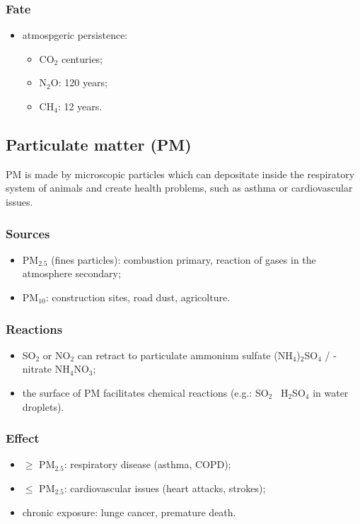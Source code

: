 \documentclass{article}
\begin{document}
\subsubsection{Fate}
\begin{itemize}
    \item atmospgeric persistence:
        \begin{itemize}
            \item CO$_2$ centuries;
            \item N$_2$O: 120 years;
            \item CH$_4$: 12 years.
        \end{itemize}
\end{itemize}

\newpage
\subsection{Particulate matter (PM)}
PM is made by microscopic particles which can depositate inside the
respiratory system of animals and create health problems, such as asthma
or cardiovascular issues.

\subsubsection{Sources}
\begin{itemize}
    \item PM$_{2.5}$ (fines particles): combustion primary, reaction of gases in the atmosphere secondary;
    \item PM$_{10}$: construction sites, road dust, agricolture.
\end{itemize}

\subsubsection{Reactions}
\begin{itemize}
    \item SO$_2$ or NO$_2$ can retract to particulate ammonium sulfate (NH$_4$)$_2$SO$_4$ /
        -nitrate NH$_4$NO$_3$;
    \item the surface of PM facilitates chemical reactions (e.g.: SO$_2$ \textrightarrow\ H$_2$SO$_4$ in water droplets).
\end{itemize}

\subsubsection{Effect}
\begin{itemize}
    \item $\geq$ PM$_{2.5}$: respiratory disease (asthma, COPD);
    \item $\leq$ PM$_{2.5}$: cardiovascular issues (heart attacks, strokes);
    \item chronic exposure: lunge cancer, premature death.
\end{itemize}
\end{document}

